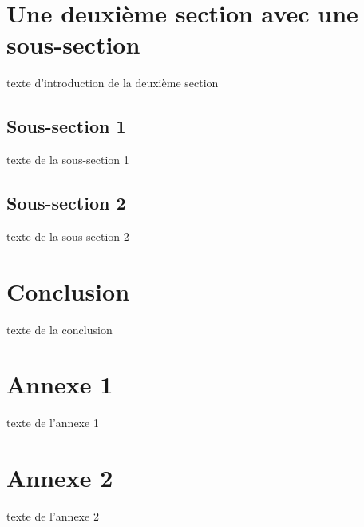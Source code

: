 \documentclass[a4paper,11pt]{article}
\begin{document}
   \section{Une deuxième section avec une sous-section}
      texte d’introduction de la deuxième section
      \subsection{Sous-section 1}
         texte de la sous-section 1
      \subsection{Sous-section 2}
         texte de la sous-section 2
   
   \section*{Conclusion}
      texte de la conclusion 
   
   \appendix  %
   \section{Annexe 1}
       texte de l’annexe 1 
  
   \section{Annexe 2}
      texte de l’annexe 2
\end{document}
